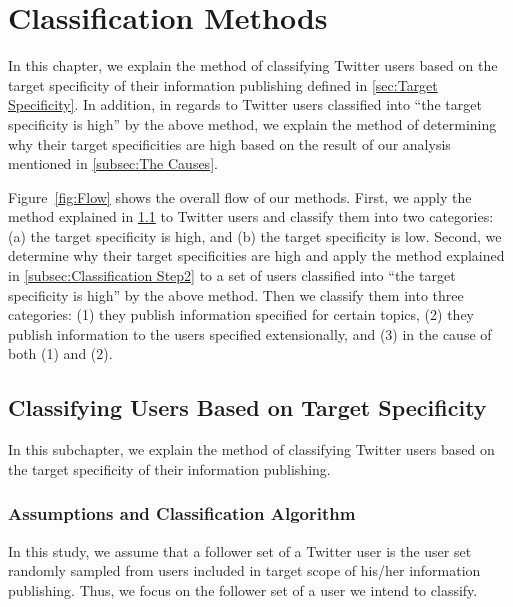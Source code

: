 \section{Classification Methods}
\label{sec:Approach}

In this chapter, we explain the method of classifying Twitter users
based on the target specificity of their information publishing defined
in \ref{sec:Target Specificity}.  In addition, in regards to Twitter
users classified into ``the target specificity is high'' by the above
method, we explain the method of determining why their target
specificities are high based on the result of our analysis mentioned in
\ref{subsec:The Causes}.

Figure~\ref{fig:Flow} shows the overall flow of our methods.  First, we
apply the method explained in \ref{subsec:Classification Step1} to
Twitter users and classify them into two categories: (a) the target
specificity is high, and (b) the target specificity is low.  Second, we
determine why their target specificities are high and apply the method
explained in \ref{subsec:Classification Step2} to a set of users
classified into ``the target specificity is high'' by the above method.
Then we classify them into three categories: (1) they publish
information specified for certain topics, (2) they publish information
to the users specified extensionally, and (3) in the cause of both (1)
and (2).

\subsection{Classifying Users Based on Target Specificity}
\label{subsec:Classification Step1}

In this subchapter, we explain the method of classifying Twitter users
based on the target specificity of their information publishing.

\subsubsection{Assumptions and Classification Algorithm}
\label{subsubsec:Algorithm}

In this study, we assume that a follower set of a Twitter user is the
user set randomly sampled from users included in target scope of his/her
information publishing.  Thus, we focus on the follower set of a user we
intend to classify.

